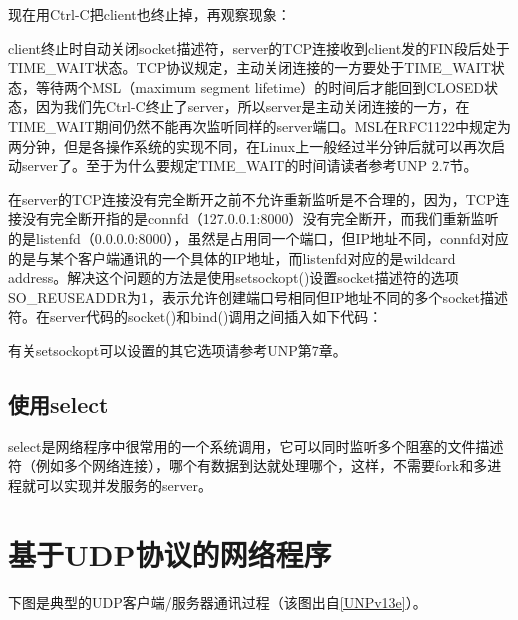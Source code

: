 现在用Ctrl-C把client也终止掉，再观察现象：




client终止时自动关闭socket描述符，server的TCP连接收到client发的FIN段后处于TIME\_\BookSplit{}WAIT状态。TCP协议规定，主动关闭连接的一方要处于TIME\_\BookSplit{}WAIT状态，等待两个MSL（maximum segment lifetime）的时间后才能回到CLOSED状态，因为我们先Ctrl-C终止了server，所以server是主动关闭连接的一方，在TIME\_\BookSplit{}WAIT期间仍然不能再次监听同样的server端口。MSL在RFC1122中规定为两分钟，但是各操作系统的实现不同，在Linux上一般经过半分钟后就可以再次启动server了。至于为什么要规定TIME\_\BookSplit{}WAIT的时间请读者参考UNP 2.\BookSplit{}7节。



在server的TCP连接没有完全断开之前不允许重新监听是不合理的，因为，TCP连接没有完全断开指的是connfd（127.\BookSplit{}0.\BookSplit{}0.\BookSplit{}1:\BookSplit{}8000）没有完全断开，而我们重新监听的是listenfd（0.\BookSplit{}0.\BookSplit{}0.\BookSplit{}0:\BookSplit{}8000），虽然是占用同一个端口，但IP地址不同，connfd对应的是与某个客户端通讯的一个具体的IP地址，而listenfd对应的是wildcard address。解决这个问题的方法是使用setsockopt()设置socket描述符的选项SO\_\BookSplit{}REUSEADDR为1，表示允许创建端口号相同但IP地址不同的多个socket描述符。在server代码的socket()和bind()调用之间插入如下代码：




有关setsockopt可以设置的其它选项请参考UNP第7章。


\subsection{使用select}
%


select是网络程序中很常用的一个系统调用，它可以同时监听多个阻塞的文件描述符（例如多个网络连接），哪个有数据到达就处理哪个，这样，不需要fork和多进程就可以实现并发服务的server。






\section{基于UDP协议的网络程序}
%
下图是典型的UDP客户端/服务器通讯过程（该图出自\hyperlink{db.bi01.bibli.unp}{[UNPv13e]}）。



